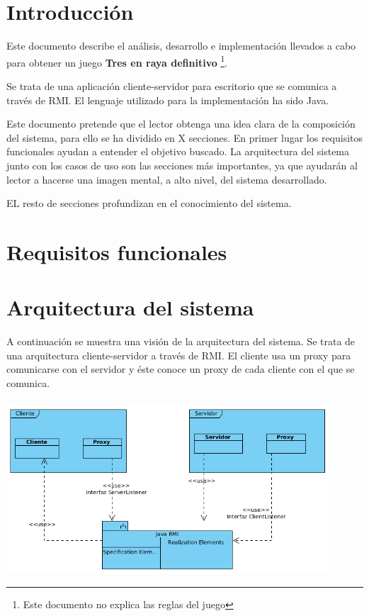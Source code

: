 \documentclass[a4paper,11pt,oneside]{article}
\begin{document}

\clearpage
\section{Introducción}

Este documento describe el análisis, desarrollo e implementación llevados a cabo para obtener 
un juego \textbf{Tres en raya definitivo} \footnote{Este documento no explica las reglas del juego}.

Se trata de una aplicación cliente-servidor para escritorio que se comunica a través de RMI.
El lenguaje utilizado para la implementación ha sido Java.

Este documento pretende que el lector obtenga una idea clara de la composición del sistema, para ello 
se ha dividido en X secciones. En primer lugar los requisitos funcionales ayudan a entender el objetivo
buscado. La arquitectura del sistema junto con los casos de uso son las secciones más importantes, ya 
que ayudarán al lector a hacerse una imagen mental, a alto nivel, del sistema desarrollado. 

EL resto de secciones profundizan en el conocimiento del sistema.

\clearpage

\pagestyle{fancy}

\section{Requisitos funcionales}
% 


\section{Arquitectura del sistema}

A continuación se muestra una visión de la arquitectura del sistema. Se trata de 
una arquitectura cliente-servidor a través de RMI. El cliente usa un
proxy para comunicarse con el servidor y éste conoce un proxy de cada cliente con el 
que se comunica.
\\ \\
\includegraphics[width=0.9\textwidth]{img/arquitectura/arquitectura.png}\\[1cm]
\end{document}
